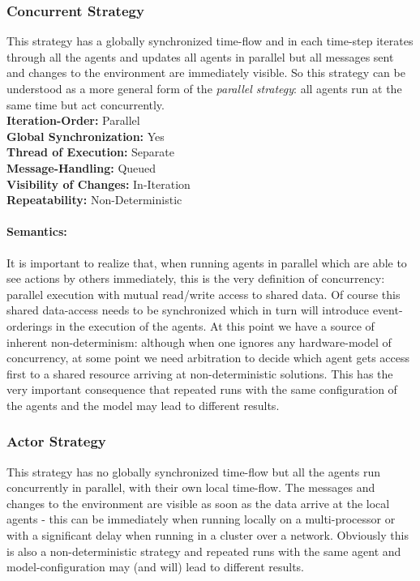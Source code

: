 \subsubsection{Concurrent Strategy}
This strategy has a globally synchronized time-flow and in each time-step iterates through all the agents and updates all agents in parallel but all messages sent and changes to the environment are immediately visible. So this strategy can be understood as a more general form of the \textit{parallel strategy}: all agents run at the same time but act concurrently. \\

\textbf{Iteration-Order:} Parallel \\
\textbf{Global Synchronization:} Yes \\
\textbf{Thread of Execution:} Separate \\
\textbf{Message-Handling:} Queued \\
\textbf{Visibility of Changes:}	In-Iteration \\
\textbf{Repeatability:}	Non-Deterministic 

\paragraph{Semantics:} It is important to realize that, when running agents in parallel which are able to see actions by others immediately, this is the very definition of concurrency: parallel execution with mutual read/write access to shared data. Of course this shared data-access needs to be synchronized which in turn will introduce event-orderings in the execution of the agents. At this point we have a source of inherent non-determinism: although when one ignores any hardware-model of concurrency, at some point we need arbitration to decide which agent gets access first to a shared resource arriving at non-deterministic solutions. This has the very important consequence that repeated runs with the same configuration of the agents and the model may lead to different results.


\subsubsection{Actor Strategy}
This strategy has no globally synchronized time-flow but all the agents run concurrently in parallel, with their own local time-flow. The messages and changes to the environment are visible as soon as the data arrive at the local agents - this can be immediately when running locally on a multi-processor or with a significant delay when running in a cluster over a network. Obviously this is also a non-deterministic strategy and repeated runs with the same agent and model-configuration may (and will) lead to different results. \\

